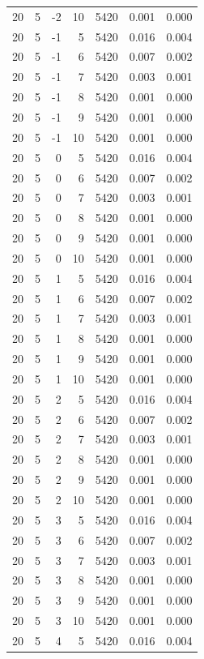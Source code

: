 \begin{table}
\begin{tabular}{rrrrrrr}
20 & 5 & -2 & 10 & 5420 & 0.001 & 0.000 \\
20 & 5 & -1 & 5 & 5420 & 0.016 & 0.004 \\
20 & 5 & -1 & 6 & 5420 & 0.007 & 0.002 \\
20 & 5 & -1 & 7 & 5420 & 0.003 & 0.001 \\
20 & 5 & -1 & 8 & 5420 & 0.001 & 0.000 \\
20 & 5 & -1 & 9 & 5420 & 0.001 & 0.000 \\
20 & 5 & -1 & 10 & 5420 & 0.001 & 0.000 \\
20 & 5 & 0 & 5 & 5420 & 0.016 & 0.004 \\
20 & 5 & 0 & 6 & 5420 & 0.007 & 0.002 \\
20 & 5 & 0 & 7 & 5420 & 0.003 & 0.001 \\
20 & 5 & 0 & 8 & 5420 & 0.001 & 0.000 \\
20 & 5 & 0 & 9 & 5420 & 0.001 & 0.000 \\
20 & 5 & 0 & 10 & 5420 & 0.001 & 0.000 \\
20 & 5 & 1 & 5 & 5420 & 0.016 & 0.004 \\
20 & 5 & 1 & 6 & 5420 & 0.007 & 0.002 \\
20 & 5 & 1 & 7 & 5420 & 0.003 & 0.001 \\
20 & 5 & 1 & 8 & 5420 & 0.001 & 0.000 \\
20 & 5 & 1 & 9 & 5420 & 0.001 & 0.000 \\
20 & 5 & 1 & 10 & 5420 & 0.001 & 0.000 \\
20 & 5 & 2 & 5 & 5420 & 0.016 & 0.004 \\
20 & 5 & 2 & 6 & 5420 & 0.007 & 0.002 \\
20 & 5 & 2 & 7 & 5420 & 0.003 & 0.001 \\
20 & 5 & 2 & 8 & 5420 & 0.001 & 0.000 \\
20 & 5 & 2 & 9 & 5420 & 0.001 & 0.000 \\
20 & 5 & 2 & 10 & 5420 & 0.001 & 0.000 \\
20 & 5 & 3 & 5 & 5420 & 0.016 & 0.004 \\
20 & 5 & 3 & 6 & 5420 & 0.007 & 0.002 \\
20 & 5 & 3 & 7 & 5420 & 0.003 & 0.001 \\
20 & 5 & 3 & 8 & 5420 & 0.001 & 0.000 \\
20 & 5 & 3 & 9 & 5420 & 0.001 & 0.000 \\
20 & 5 & 3 & 10 & 5420 & 0.001 & 0.000 \\
20 & 5 & 4 & 5 & 5420 & 0.016 & 0.004 \\

\end{tabular}
\end{table}
